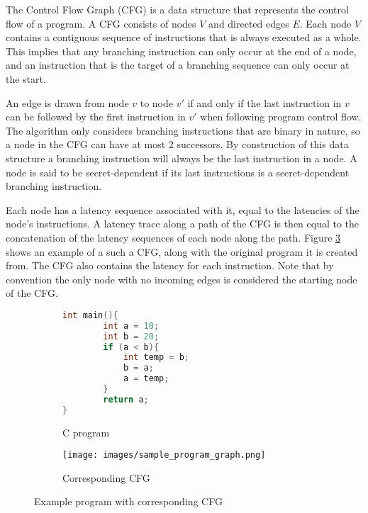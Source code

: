 The Control Flow Graph (CFG) is a data structure that represents the control flow of a program. A CFG consists of nodes $V$ and directed edges $E$. Each node $V$ contains a 
contiguous sequence of instructions that is always executed as a whole. This implies that any branching instruction can only occur at the end of a node, 
and an instruction that is the target of a branching sequence can only occur at the start. 

An edge is drawn from node $v$ to node $v'$ if and only if the last instruction in $v$ can be followed by the first instruction in $v'$ 
when following program control flow. The algorithm only considers branching instructions that are binary in nature, so a node in the CFG can have at most 2 successors. 
By construction of this data structure a branching instruction will always be the last instruction in a node. A node is said to be secret-dependent if its last instructions is a 
secret-dependent branching instruction. 

Each node has a latency sequence associated with it, equal to the latencies of the node's instructions.  
A latency trace along a path of the CFG is then equal to the concatenation of the latency sequences of each node along the path.
Figure \ref{fig:exampleCFG} shows an example of a such a CFG, along with the original program it is created from. The CFG also contains the latency for each instruction. Note that by convention the only node with no incoming edges is considered the starting node of the CFG. 

\begin{figure}
\centering
\begin{subfigure}{.4\textwidth}
  \centering
  
    \begin{lstlisting}[language=C]
int main(){
        int a = 10; 
        int b = 20; 
        if (a < b){
            int temp = b; 
            b = a; 
            a = temp; 
        } 
        return a;  
}\end{lstlisting}
  \caption{C program}
  \label{fig:c_program}
\end{subfigure}%
\begin{subfigure}{.7\textwidth}
  \centering
  \texttt{[image: images/sample\_program\_graph.png]}
  \caption{Corresponding CFG}
  \label{fig:c_program_cfg}
\end{subfigure}
\caption{Example program with corresponding CFG}
\label{fig:exampleCFG}
\end{figure}

